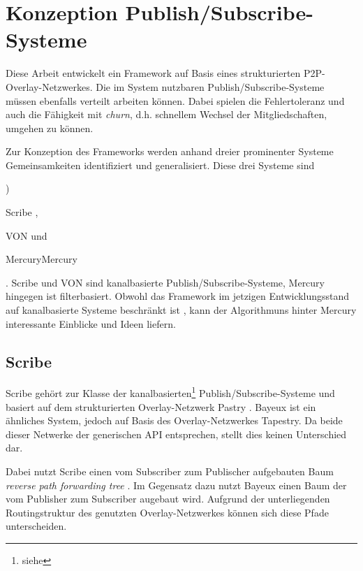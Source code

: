 \chapter{Konzeption Publish/Subscribe-Systeme}
\label{chap:konzeption_pubsub}
Diese Arbeit entwickelt ein Framework auf Basis eines strukturierten P2P-Overlay-Netzwerkes. Die im System nutzbaren Publish/Subscribe-Systeme müssen ebenfalls verteilt arbeiten können. Dabei spielen die Fehlertoleranz und auch die Fähigkeit mit \emph{churn}, d.h. schnellem Wechsel der Mitgliedschaften, umgehen zu können.

Zur Konzeption des Frameworks werden anhand dreier prominenter Systeme Gemeinsamkeiten identifiziert und generalisiert. Diese drei Systeme sind \begin{inparaenum}[(1]) \item Scribe \cite{Castro2002Scribe}, \item VON \cite{Hu2006VON} und \item MercuryMercury \end{inparaenum}. Scribe und VON sind kanalbasierte Publish/Subscribe-Systeme, Mercury hingegen ist filterbasiert. Obwohl das Framework im jetzigen Entwicklungsstand auf kanalbasierte Systeme beschränkt ist , kann der Algorithmuns hinter Mercury interessante Einblicke und Ideen liefern.


\section*{Scribe}
\label{chap:related:scribe}
Scribe \cite{Castro2002Scribe} gehört zur Klasse der kanalbasierten\footnote{siehe } Publish/Subscribe-Systeme und basiert auf dem strukturierten Overlay-Netzwerk Pastry \cite{Rowstron2001}. Bayeux \cite{Zhuang2001} ist ein ähnliches System, jedoch auf Basis des Overlay-Netzwerkes Tapestry. Da beide dieser Netwerke der generischen API entsprechen, stellt dies keinen Unterschied dar.

Dabei nutzt Scribe einen vom Subscriber zum Publischer aufgebauten Baum \emph{reverse path forwarding tree} \cite{Dalal1978}. Im Gegensatz dazu nutzt Bayeux einen Baum der vom Publisher zum Subscriber augebaut wird. Aufgrund der unterliegenden Routingstruktur des genutzten Overlay-Netzwerkes können sich diese Pfade unterscheiden.

